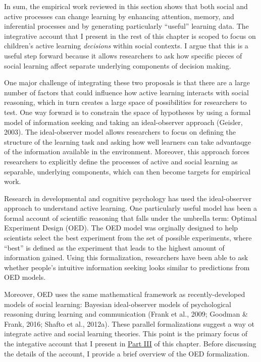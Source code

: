 \documentclass[oneside]{report}
\begin{document}
In sum, the empirical work reviewed in this section shows that both
social and active processes can change learning by enhancing attention,
memory, and inferential processes and by generating particularly
``useful'' learning data. The integrative account that I present in the
rest of this chapter is scoped to focus on children's active learning
\emph{decisions} within social contexts. I argue that this is a useful
step forward because it allows researchers to ask how specific pieces of
social learning affect separate underlying components of decision
making.

One major challenge of integrating these two proposals is that there are
a large number of factors that could influence how active learning
interacts with social reasoning, which in turn creates a large space of
possibilities for researchers to test. One way forward is to constrain
the space of hypotheses by using a formal model of information seeking
and taking an ideal-observer approach (Geisler, 2003). The
ideal-observer model allows researchers to focus on defining the
structure of the learning task and asking how well learners can take
advantaqge of the information available in the environment. Moreover,
this approach forces researchers to explicitly define the processes of
active and social learning as separable, underlying components, which
can then become targets for empirical work.

Research in developmental and cognitive psychology has used the
ideal-observer approach to understand active learning. One particularly
useful model has been a formal account of scientific reasoning that
falls under the umbrella term: Optimal Experiment Design (OED). The OED
model was orginally designed to help scientists select the best
experiment from the set of possible experiments, where ``best'' is
defined as the experiment that leads to the highest amount of
information gained. Using this formalization, researchers have been able
to ask whether people's intuitive information seeking looks similar to
predictions from OED models.

Moreover, OED uses the same mathematical framework as recently-developed
models of social learning: Bayesian ideal-observer models of
psychological reasoning during learning and communication (Frank et al.,
2009; Goodman \& Frank, 2016; Shafto et al., 2012a). These parallel
formalizations suggest a way ot integrate active and social learning
theories. This point is the primary focus of the integative account that
I present in \protect\hyperlink{active_social}{Part III} of this
chapter. Before discussing the details of the account, I provide a brief
overview of the OED formalization.
\end{document}
